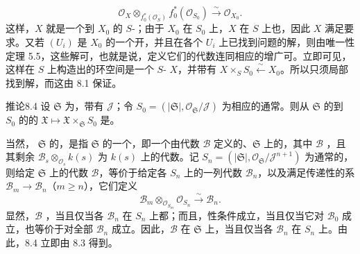 \[
 \mathcal O_X\otimes_{f_0^*(\mathcal O_S)}f_0^*(\mathcal O_{S_0})
 \xrightarrow{\sim}\mathcal O_{X_0}.
\]
这样，$X$ 就是一个到 $X_0$ 的 $S$-；由于 $X_0$ 在 $S_0$ 上，$X$ 在 $S$ 上也，因此 $X$ 满足要求。又若 $(U_i)$ 是 $X_0$ 的一个开，并且在各个 $U_i$ 上已找到问题的解，则由唯一性定理 5.5，这些解可，也就是说，定义它们的代数连同相应的增广可。立即可见，这样在 $S$ 上构造出的环空间是一个 $S$- $X$，并带有 $X\times_S S_0\xleftarrow{\sim}X_0$。所以只须局部找到解，而这由 8.1 保证。
\begin{SGAresult}{推论}{8.4}
设 $\mathfrak S$ 为，带有 $\mathcal J$；令 $S_0=(|\mathfrak S|,\mathcal O_{\mathfrak S}/\mathcal J)$ 为相应的通常。则从 $\mathfrak S$ 的到 $S_0$ 的的 $\mathfrak X\mapsto\mathfrak X\times_{\mathfrak S}S_0$ 是。
\end{SGAresult}

当然， $\mathfrak S$ 的，是指 $\mathfrak S$ 的一个，即一个由代数 $\mathcal B$ 定义的、$\mathfrak S$ 上的，其中 $\mathcal B$ ，且其剩余 $\mathcal B_s\otimes_{\mathcal O_s}k(s)$ 为 $k(s)$ 上的代数。记 $S_n=(|\mathfrak S|,\mathcal O_{\mathfrak S}/\mathcal J^{n+1})$ 为通常的，则给定 $\mathfrak S$ 上的代数 $\mathcal B$，等价于给定各 $S_n$ 上的一列代数 $\mathcal B_n$，以及满足传递性的系 $\mathcal B_m\to\mathcal B_n$（$m\geq n$），它们定义
\[
 \mathcal B_m\otimes_{\mathcal O_{S_m}}\mathcal O_{S_n}
 \xrightarrow{\sim}\mathcal B_n.
\]
显然，$\mathcal B$ ，当且仅当各 $\mathcal B_n$ 在 $S_n$ 上都；而且，性条件成立，当且仅当它对 $\mathcal B_0$ 成立，也等价于对全部 $\mathcal B_n$ 成立。因此，$\mathcal B$ 在 $\mathfrak S$ 上，当且仅当各 $\mathcal B_n$ 在 $S_n$ 上。由此，8.4 立即由 8.3 得到。

